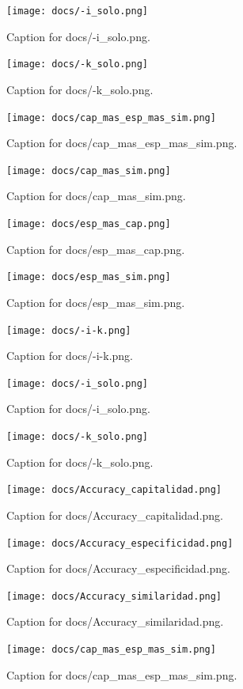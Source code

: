 \documentclass{article}
\begin{document}
\begin{figure}[h] \centering \texttt{[image: docs/-i\_solo.png]} \caption{Caption for docs/-i_solo.png.} \end{figure}
\begin{figure}[h] \centering \texttt{[image: docs/-k\_solo.png]} \caption{Caption for docs/-k_solo.png.} \end{figure}
\begin{figure}[h] \centering \texttt{[image: docs/cap\_mas\_esp\_mas\_sim.png]} \caption{Caption for docs/cap_mas_esp_mas_sim.png.} \end{figure}
\begin{figure}[h] \centering \texttt{[image: docs/cap\_mas\_sim.png]} \caption{Caption for docs/cap_mas_sim.png.} \end{figure}
\begin{figure}[h] \centering \texttt{[image: docs/esp\_mas\_cap.png]} \caption{Caption for docs/esp_mas_cap.png.} \end{figure}
\begin{figure}[h] \centering \texttt{[image: docs/esp\_mas\_sim.png]} \caption{Caption for docs/esp_mas_sim.png.} \end{figure}
\begin{figure}[h] \centering \texttt{[image: docs/-i-k.png]} \caption{Caption for docs/-i-k.png.} \end{figure}
\begin{figure}[h] \centering \texttt{[image: docs/-i\_solo.png]} \caption{Caption for docs/-i_solo.png.} \end{figure}
\begin{figure}[h] \centering \texttt{[image: docs/-k\_solo.png]} \caption{Caption for docs/-k_solo.png.} \end{figure}
\begin{figure}[h] \centering \texttt{[image: docs/Accuracy\_capitalidad.png]} \caption{Caption for docs/Accuracy_capitalidad.png.} \end{figure}
\begin{figure}[h] \centering \texttt{[image: docs/Accuracy\_especificidad.png]} \caption{Caption for docs/Accuracy_especificidad.png.} \end{figure}
\begin{figure}[h] \centering \texttt{[image: docs/Accuracy\_similaridad.png]} \caption{Caption for docs/Accuracy_similaridad.png.} \end{figure}
\begin{figure}[h] \centering \texttt{[image: docs/cap\_mas\_esp\_mas\_sim.png]} \caption{Caption for docs/cap_mas_esp_mas_sim.png.} \end{figure}
\end{document}
